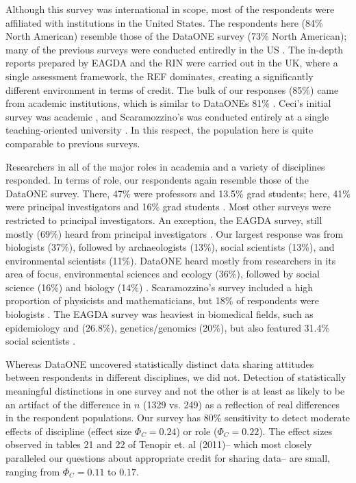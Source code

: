 \documentclass[10pt]{article}
\begin{document}
Although this survey was international in scope, most of the respondents were affiliated with institutions in the United States.
The respondents here (84\% North American) resemble those of the DataONE survey \cite{tenopir_data_2011} (73\% North American); many of the previous surveys were conducted entiredly in the US \cite{ceci_scientists_1988, kim_institutional_2012, scaramozzino_study_2012}.
The in-depth reports prepared by EAGDA \cite{bobrow_establishing_2014} and the RIN \cite{swan_share_2008} were carried out in the UK, where a single assessment framework, the REF dominates, creating a significantly different environment in terms of credit.
The bulk of our responses (85\%) came from academic institutions, which is similar to DataONEs 81\% \cite{tenopir_data_2011}.  
Ceci's initial survey was academic \cite{ceci_scientists_1988}, and Scaramozzino's was conducted entirely at a single teaching-oriented university \cite{scaramozzino_study_2012}.
In this respect, the population here is quite comparable to previous surveys.

Researchers in all of the major roles in academia and a variety of disciplines responded.
In terms of role, our respondents again resemble those of the DataONE survey.
There, 47\% were professors and 13.5\% grad students; here, 41\% were principal investigators and 16\% grad students \cite{tenopir_data_2011}.
Most other surveys were restricted to principal investigators.
An exception, the EAGDA survey, still mostly (69\%) heard from principal investigators \cite{bobrow_establishing_2014}.
Our largest response was from biologists (37\%), followed by archaeologists (13\%), social scientists (13\%), and environmental scientists (11\%). 
DataONE heard mostly from researchers in its area of focus, environmental sciences and ecology (36\%), followed by social science (16\%) and biology (14\%) \cite{tenopir_data_2011}. 
Scaramozzino's survey included a high proportion of physicists and mathematicians, but 18\% of respondents were biologists \cite{scaramozzino_study_2012}.
The EAGDA survey was heaviest in biomedical fields, such as epidemiology and (26.8\%), genetics/genomics (20\%), but also featured 31.4\% social scientists \cite{bobrow_establishing_2014}. 

Whereas DataONE uncovered statistically distinct data sharing attitudes between respondents in different disciplines, we did not.
Detection of statistically meaningful distinctions in one survey and not the other is at least as likely to be an artifact of the difference in $n$ (1329 vs. 249) as a reflection of real differences in the respondent populations.
Our survey has 80\% sensitivity to detect moderate effects of discipline (effect size $\Phi_{C}=0.24$) or role ($\Phi_{C}=0.22$)\cite{cohen_statisctical_1988}.
The effect sizes observed in tables 21 and 22 of Tenopir et. al (2011)\cite{tenopir_data_2011}-- which most closely paralleled our questions about appropriate credit for sharing data-- are small, ranging from $\Phi_{C}=0.11$ to $0.17$.
\end{document}
